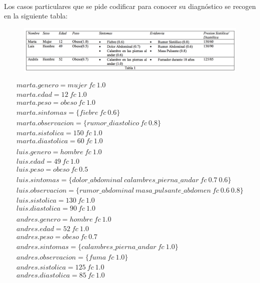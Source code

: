 \documentclass[10pt, a4paper,spanish]{article}
\begin{document}
			\paragraph{}
			Los casos particulares que se pide codificar para conocer su diagnóstico se recogen en la siguiente tabla:

			\begin{figure}[H]
				\begin{center}
					\includegraphics[width=\textwidth]{table-1}
				\end{center}
			\end{figure}

			\begin{equation*}
				\begin{split}
					marta.genero=mujer \ fc \  1.0 \\
					marta.edad=12 \ fc \  1.0 \\
					marta.peso=obeso \ fc \  1.0 \\
					marta.sintomas=\{fiebre \ fc \  0.6\} \\
					marta.observacion=\{rumor\_diastolico \ fc \  0.8\} \\
					marta.sistolica=150 \ fc \  1.0 \\
					marta.diastolica=60 \ fc \  1.0\\
					\\
					luis.genero=hombre  \ fc \  1.0 \\
					luis.edad=49  \ fc \   1.0 \\
					luis.peso=obeso \ fc \  0.5 \\
					luis.sintomas=\{dolor\_abdominal \ calambres\_pierna\_andar \ fc \  0.7 \ 0.6\} \\
					luis.observacion=\{rumor\_abdominal \ masa\_pulsante\_abdomen \ fc \  0.6 \ 0.8\} \\
					luis.sistolica=130 \ fc \  1.0 \\
					luis.diastolica=90 \ fc \  1.0 \\
					\\
					andres.genero=hombre \ fc \  1.0 \\
					andres.edad=52 \ fc \  1.0 \\
					andres.peso=obeso \ fc \  0.7 \\
					andres.sintomas=\{calambres\_pierna\_andar \ fc \  1.0 \} \\
					andres.observacion=\{fuma \ fc \  1.0\} \\
					andres.sistolica=125 \ fc \  1.0 \\
					andres.diastolica=85 \ fc \  1.0 \\
				\end{split}
			\end{equation*}
\end{document}
